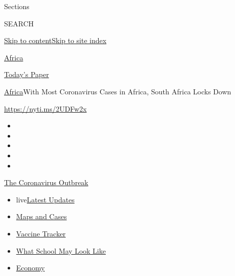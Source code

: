 Sections

SEARCH

\protect\hyperlink{site-content}{Skip to
content}\protect\hyperlink{site-index}{Skip to site index}

\href{https://www.nytimes.com/section/world/africa}{Africa}

\href{https://myaccount.nytimes.com/auth/login?response_type=cookie\&client_id=vi}{}

\href{https://www.nytimes.com/section/todayspaper}{Today's Paper}

\href{/section/world/africa}{Africa}\textbar{}With Most Coronavirus
Cases in Africa, South Africa Locks Down

\url{https://nyti.ms/2UDFw2x}

\begin{itemize}
\item
\item
\item
\item
\item
\end{itemize}

\href{https://www.nytimes.com/news-event/coronavirus?action=click\&pgtype=Article\&state=default\&region=TOP_BANNER\&context=storylines_menu}{The
Coronavirus Outbreak}

\begin{itemize}
\tightlist
\item
  live\href{https://www.nytimes.com/2020/08/01/world/coronavirus-covid-19.html?action=click\&pgtype=Article\&state=default\&region=TOP_BANNER\&context=storylines_menu}{Latest
  Updates}
\item
  \href{https://www.nytimes.com/interactive/2020/us/coronavirus-us-cases.html?action=click\&pgtype=Article\&state=default\&region=TOP_BANNER\&context=storylines_menu}{Maps
  and Cases}
\item
  \href{https://www.nytimes.com/interactive/2020/science/coronavirus-vaccine-tracker.html?action=click\&pgtype=Article\&state=default\&region=TOP_BANNER\&context=storylines_menu}{Vaccine
  Tracker}
\item
  \href{https://www.nytimes.com/interactive/2020/07/29/us/schools-reopening-coronavirus.html?action=click\&pgtype=Article\&state=default\&region=TOP_BANNER\&context=storylines_menu}{What
  School May Look Like}
\item
  \href{https://www.nytimes.com/live/2020/07/31/business/stock-market-today-coronavirus?action=click\&pgtype=Article\&state=default\&region=TOP_BANNER\&context=storylines_menu}{Economy}
\end{itemize}

